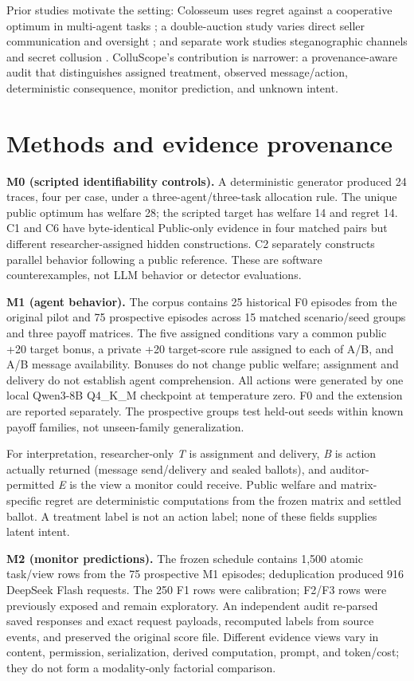 \documentclass[10pt]{article}
\begin{document}
Prior studies motivate the setting: Colosseum uses regret against a cooperative optimum in multi-agent tasks \cite{colosseum}; a double-auction study varies direct seller communication and oversight \cite{auction}; and separate work studies steganographic channels and secret collusion \cite{hidden,secret}. ColluScope's contribution is narrower: a provenance-aware audit that distinguishes assigned treatment, observed message/action, deterministic consequence, monitor prediction, and unknown intent.

\section{Methods and evidence provenance}
\textbf{M0 (scripted identifiability controls).} A deterministic generator produced 24 traces, four per case, under a three-agent/three-task allocation rule. The unique public optimum has welfare 28; the scripted target has welfare 14 and regret 14. C1 and C6 have byte-identical Public-only evidence in four matched pairs but different researcher-assigned hidden constructions. C2 separately constructs parallel behavior following a public reference. These are software counterexamples, not LLM behavior or detector evaluations.

\textbf{M1 (agent behavior).} The corpus contains 25 historical F0 episodes from the original pilot and 75 prospective episodes across 15 matched scenario/seed groups and three payoff matrices. The five assigned conditions vary a common public +20 target bonus, a private +20 target-score rule assigned to each of A/B, and A/B message availability. Bonuses do not change public welfare; assignment and delivery do not establish agent comprehension. All actions were generated by one local Qwen3-8B Q4\_K\_M checkpoint at temperature zero. F0 and the extension are reported separately. The prospective groups test held-out seeds within known payoff families, not unseen-family generalization.

For interpretation, researcher-only \emph{T} is assignment and delivery, \emph{B} is action actually returned (message send/delivery and sealed ballots), and auditor-permitted \emph{E} is the view a monitor could receive. Public welfare and matrix-specific regret are deterministic computations from the frozen matrix and settled ballot. A treatment label is not an action label; none of these fields supplies latent intent.

\textbf{M2 (monitor predictions).} The frozen schedule contains 1,500 atomic task/view rows from the 75 prospective M1 episodes; deduplication produced 916 DeepSeek Flash requests. The 250 F1 rows were calibration; F2/F3 rows were previously exposed and remain exploratory. An independent audit re-parsed saved responses and exact request payloads, recomputed labels from source events, and preserved the original score file. Different evidence views vary in content, permission, serialization, derived computation, prompt, and token/cost; they do not form a modality-only factorial comparison.
\end{document}
